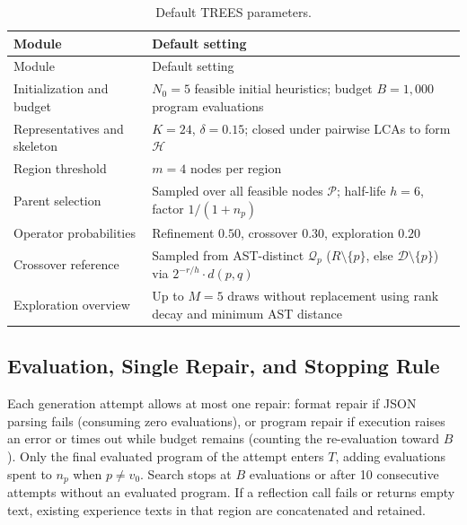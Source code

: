 \documentclass{article}
\begin{document}
\begin{longtable}[]{@{}
  >{\raggedright\arraybackslash}p{}
  >{\raggedright\arraybackslash}p{}@{}}
\caption{Default TREES parameters.}\tabularnewline
\toprule\noalign{}
\begin{minipage}[b]{\linewidth}\raggedright
Module
\end{minipage} & \begin{minipage}[b]{\linewidth}\raggedright
Default setting
\end{minipage} \\
\midrule\noalign{}
\endfirsthead
\toprule\noalign{}
\begin{minipage}[b]{\linewidth}\raggedright
Module
\end{minipage} & \begin{minipage}[b]{\linewidth}\raggedright
Default setting
\end{minipage} \\
\midrule\noalign{}
\endhead
\bottomrule\noalign{}
\endlastfoot
Initialization and budget & \(N_0=5\) feasible initial heuristics; budget \(B=1{,}000\) program evaluations \\
Representatives and skeleton & \(K=24\), \(\delta=0.15\); closed under pairwise LCAs to form \(\mathcal H\) \\
Region threshold & \(m=4\) nodes per region \\
Parent selection & Sampled over all feasible nodes \(\mathcal P\); half-life \(h=6\), factor \(1/(1+n_p)\) \\
Operator probabilities & Refinement \(0.50\), crossover \(0.30\), exploration \(0.20\) \\
Crossover reference & Sampled from AST-distinct \(\mathcal Q_p\) (\(R\setminus\{p\}\), else \(\mathcal D\setminus\{p\}\)) via \(2^{-r/h}\cdot d(p,q)\) \\
Exploration overview & Up to \(M=5\) draws without replacement using rank decay and minimum AST distance \\
\end{longtable}

\subsection{Evaluation, Single Repair, and Stopping Rule}\label{evaluation-single-repair-and-stopping-rule}

Each generation attempt allows at most one repair: format repair if JSON parsing fails (consuming zero evaluations), or program repair if execution raises an error or times out while budget remains (counting the re-evaluation toward \(B\)). Only the final evaluated program of the attempt enters \(T\), adding evaluations spent to \(n_p\) when \(p\neq v_0\). Search stops at \(B\) evaluations or after 10 consecutive attempts without an evaluated program. If a reflection call fails or returns empty text, existing experience texts in that region are concatenated and retained.
\end{document}
